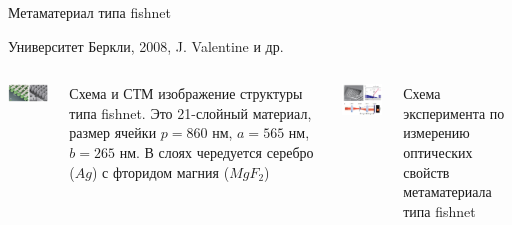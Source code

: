 \documentclass[9pt, compress, xcolor=table]{beamer}
\begin{document}
\begin{frame}{Метаматериал типа fishnet}

{\scriptsize Университет Беркли, 2008, J. Valentine и др.}

\begin{columns}[c]
\column{6cm}
\begin{center}
\includegraphics[width=5cm]{neg_ref_24}
\end{center}
{\tiny Схема и СТМ изображение структуры типа fishnet. Это 21-слойный материал, размер ячейки
$p=860$ нм, $a=565$ нм, $b = 265$ нм. В слоях чередуется серебро ($Ag$) с фторидом магния
($MgF_2$)}

\column{6cm}
\begin{center}
\includegraphics[width=5cm]{neg_ref_25}
\end{center}

{\tiny Схема эксперимента по измерению оптических свойств метаматериала типа fishnet}
\end{columns}
\end{frame}
\end{document}

